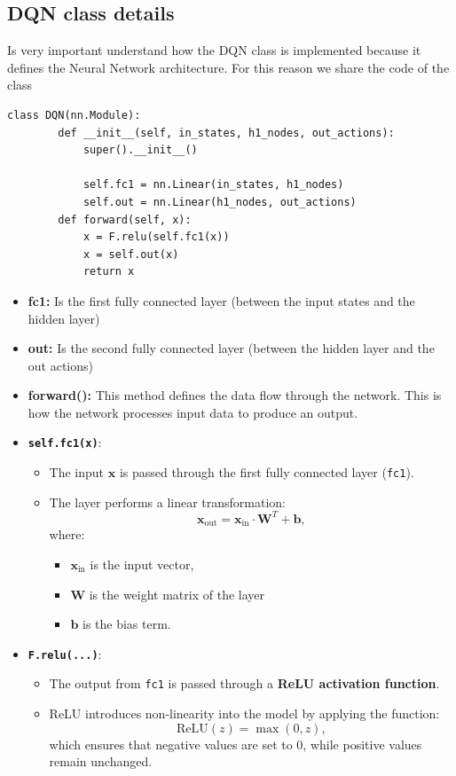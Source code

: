 \subsection{DQN class details}\label{sec:dqn_class}
Is very important understand how the DQN class is implemented because it defines the Neural Network architecture.
For this reason we share the code of the class
\begin{lstlisting}[caption={DQN Neural Network Implementation}]
    class DQN(nn.Module):
        def __init__(self, in_states, h1_nodes, out_actions):
            super().__init__()
    
            self.fc1 = nn.Linear(in_states, h1_nodes)
            self.out = nn.Linear(h1_nodes, out_actions)
        def forward(self, x):
            x = F.relu(self.fc1(x))
            x = self.out(x)
            return x
\end{lstlisting}
\begin{itemize}
    \item \textbf{fc1:} Is the first fully connected layer (between the input states and the hidden layer)
    \item \textbf{out:} Is the second fully connected layer (between the hidden layer and the out actions)
    \item \textbf{forward():} This method defines the data flow through the network. This is how the network processes input data to produce an output.
    \item \textbf{\texttt{self.fc1(x)}}:
    \begin{itemize}
        \item The input $\mathbf{x}$ is passed through the first fully connected layer (\texttt{fc1}).
        \item The layer performs a linear transformation:
        \[
        \mathbf{x}_{\text{out}} = \mathbf{x}_{\text{in}} \cdot \mathbf{W}^T + \mathbf{b},
        \]
        where:
        \begin{itemize}
            \item $\mathbf{x}_{\text{in}}$ is the input vector,
            \item $\mathbf{W}$ is the weight matrix of the layer
            \item $\mathbf{b}$ is the bias term.
        \end{itemize}
    \end{itemize}

    \item \textbf{\texttt{F.relu(...)}}:
    \begin{itemize}
        \item The output from \texttt{fc1} is passed through a \textbf{ReLU activation function}.
        \item ReLU introduces non-linearity into the model by applying the function:
        \[
        \text{ReLU}(z) = \max(0, z),
        \]
        which ensures that negative values are set to 0, while positive values remain unchanged.
    \end{itemize}
\end{itemize}

